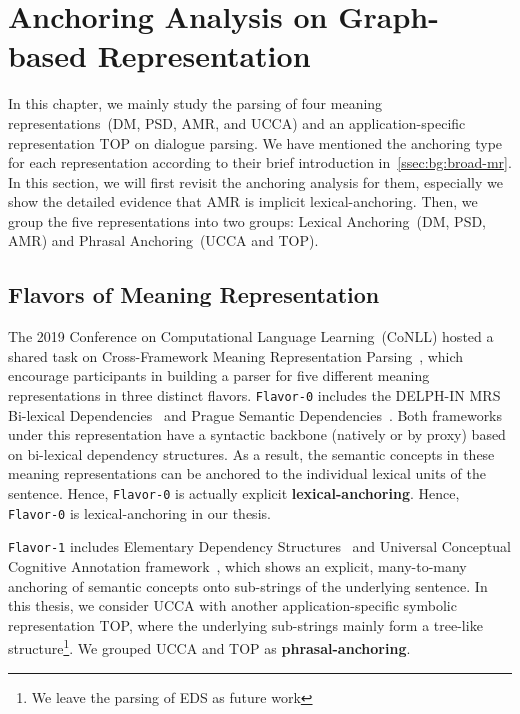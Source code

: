 \section{Anchoring Analysis on Graph-based Representation}
\label{sec:lex-phr:factorization-analysis}

In this chapter, we mainly study the parsing of four meaning
representations~(DM, PSD, AMR, and UCCA) and an application-specific
representation TOP on dialogue parsing. We have mentioned the
anchoring type for each representation according to their brief
introduction in~\autoref{ssec:bg:broad-mr}. In this section, we will
first revisit the anchoring analysis for them, especially we show the
detailed evidence that AMR is implicit lexical-anchoring. Then, we
group the five representations into two groups: Lexical Anchoring~(DM,
PSD, AMR) and Phrasal Anchoring~(UCCA and TOP).

\subsection{Flavors of Meaning Representation}
\label{ssec:lex-phr:flavors}

The 2019 Conference on Computational Language Learning~(CoNLL) hosted
a shared task on Cross-Framework Meaning Representation
Parsing~\cite[MRP 2019,][]{Oep:Abe:Haj:19}, which encourage
participants in building a parser for five different meaning
representations in three distinct flavors. \texttt{Flavor-0} includes
the DELPH-IN MRS Bi-lexical Dependencies~\cite[DM,][]{ivanova2012did}
and Prague Semantic
Dependencies~\cite[PSD,][]{hajic2012announcing,miyao2014house}. Both
frameworks under this representation have a syntactic backbone
(natively or by proxy) based on bi-lexical dependency
structures. As a result, the semantic concepts in these meaning
representations can be anchored to the individual lexical units of the
sentence. Hence, \texttt{Flavor-0} is actually explicit
\textbf{lexical-anchoring}. Hence, \texttt{Flavor-0} is
lexical-anchoring in our thesis.

\texttt{Flavor-1} includes Elementary Dependency
Structures~\cite[EDS,][]{oepen2006discriminant} and Universal
Conceptual Cognitive Annotation
framework~\cite[UCCA,][]{abend2013universal}, which shows an explicit,
many-to-many anchoring of semantic concepts onto sub-strings of the
underlying sentence. In this thesis, we consider UCCA with another
application-specific symbolic representation TOP, where the underlying
sub-strings mainly form a tree-like structure\footnote{We leave the
  parsing of EDS as future work}. We grouped UCCA and TOP as
\textbf{phrasal-anchoring}.

